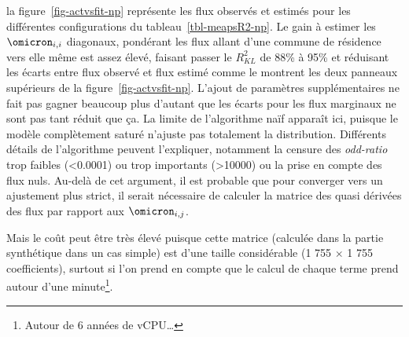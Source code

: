 \documentclass[
  10pt,
  a4paper,
  numbers=noendperiod,
  DIV=9]{scrreprt}
\begin{document}
la figure~\ref{fig-actvsfit-np} représente les flux observés et estimés
pour les différentes configurations du tableau~\ref{tbl-meapsR2-np}. Le
gain à estimer les \(\omicron_{i,i}\) diagonaux, pondérant les flux
allant d'une commune de résidence vers elle même est assez élevé,
faisant passer le \(R^2_{KL}\) de 88\% à 95\% et réduisant les écarts
entre flux observé et flux estimé comme le montrent les deux panneaux
supérieurs de la figure~\ref{fig-actvsfit-np}. L'ajout de paramètres
supplémentaires ne fait pas gagner beaucoup plus d'autant que les écarts
pour les flux marginaux ne sont pas tant réduit que ça. La limite de
l'algorithme naïf apparaît ici, puisque le modèle complètement saturé
n'ajuste pas totalement la distribution. Différents détails de
l'algorithme peuvent l'expliquer, notamment la censure des
\emph{odd-ratio} trop faibles (\textless0.0001) ou trop importants
(\textgreater10000) ou la prise en compte des flux nuls. Au-delà de cet
argument, il est probable que pour converger vers un ajustement plus
strict, il serait nécessaire de calculer la matrice des quasi dérivées
des flux par rapport aux \(\omicron_{i,j}\).

Mais le coût peut être très élevé puisque cette matrice (calculée dans
la partie synthétique dans un cas simple) est d'une taille considérable
(1 755 \(\times\) 1 755 coefficients), surtout si l'on prend en compte
que le calcul de chaque terme prend autour d'une minute\footnote{Autour
  de 6 années de vCPU\ldots{}}.
\end{document}
